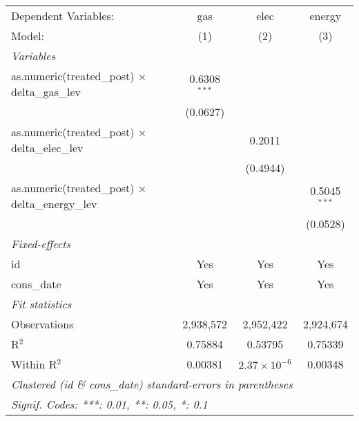 
\begin{tabular}{lccc}
   \tabularnewline\midrule\midrule
   Dependent Variables:                                      & gas            & elec                  & energy\\
   Model:                                                    & (1)            & (2)                   & (3)\\
   \midrule \emph{Variables} &   &   &  \\
   as.numeric(treated\_post) $\times$ delta\_gas\_lev    & 0.6308$^{***}$ &                       &   \\
                                                             & (0.0627)       &                       &   \\
   as.numeric(treated\_post) $\times$ delta\_elec\_lev   &                & 0.2011                &   \\
                                                             &                & (0.4944)              &   \\
   as.numeric(treated\_post) $\times$ delta\_energy\_lev &                &                       & 0.5045$^{***}$\\
                                                             &                &                       & (0.0528)\\
   \midrule \emph{Fixed-effects} &   &   &  \\
   id                                                        & Yes            & Yes                   & Yes\\
   cons\_date                                               & Yes            & Yes                   & Yes\\
   \midrule \emph{Fit statistics} &   &   &  \\
   Observations                                              & 2,938,572      & 2,952,422             & 2,924,674\\
   R$^2$                                                     & 0.75884        & 0.53795               & 0.75339\\
   Within R$^2$                                              & 0.00381        & $2.37\times 10^{-6}$ & 0.00348\\
   \midrule\midrule\multicolumn{4}{l}{\emph{Clustered (id \& cons\_date) standard-errors in parentheses}}\\
   \multicolumn{4}{l}{\emph{Signif. Codes: ***: 0.01, **: 0.05, *: 0.1}}\\
\end{tabular}


